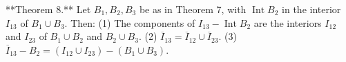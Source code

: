 **Theorem 8.** Let $B_1, B_2, B_3$ be as in Theorem 7, with $\operatorname{Int} B_2$ in the interior $I_{13}$ of $B_1 \cup B_3$. Then:
(1) The components of $I_{13} - \operatorname{Int} B_2$ are the interiors $I_{12}$ and $I_{23}$ of $B_1 \cup B_2$ and $B_2 \cup B_3$.
(2) $\overline{I}_{13} = \overline{I}_{12} \cup \overline{I}_{23}$.
(3) $\overline{I}_{13} - B_2 = (I_{12} \cup I_{23}) - (B_1 \cup B_3)$.
